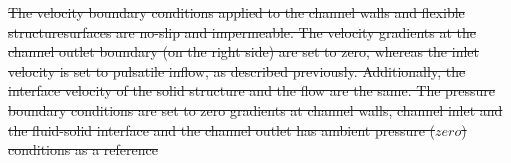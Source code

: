\documentclass[%
aip,
amsmath,amssymb,
reprint,
]{revtex4-1}
\providecommand{\DIFdel}[1]{{\protect\color{red}\sout{#1}}}                      %
\providecommand{\DIFaddbegin}{} %
\providecommand{\DIFdelbegin}{} %
\providecommand{\DIFdelend}{} %
\newcommand{\DIFscaledelfig}{0.5}
\newlength{\DIFdelgraphicswidth} %
\newlength{\DIFdelgraphicsheight} %
\newcommand{\DIFaddincludegraphics}[2][]{{\color{blue}\fbox{\DIFOincludegraphics[#1]{#2}}}} %
\newcommand{\DIFdelincludegraphics}[2][]{%
\sbox{\DIFdelgraphicsbox}{\DIFOincludegraphics[#1]{#2}}%
\settoboxwidth{\DIFdelgraphicswidth}{\DIFdelgraphicsbox} %
\settoboxtotalheight{\DIFdelgraphicsheight}{\DIFdelgraphicsbox} %
\scalebox{\DIFscaledelfig}{%
\parbox[b]{\DIFdelgraphicswidth}{\usebox{\DIFdelgraphicsbox}\\[-\baselineskip] \rule{\DIFdelgraphicswidth}{0em}}\llap{\resizebox{\DIFdelgraphicswidth}{\DIFdelgraphicsheight}{%
\setlength{\unitlength}{\DIFdelgraphicswidth}%
\begin{picture}(1,1)%
\thicklines\linethickness{2pt} %
{\color[rgb]{1,0,0}\put(0,0){\framebox(1,1){}}}%
{\color[rgb]{1,0,0}\put(0,0){\line( 1,1){1}}}%
{\color[rgb]{1,0,0}\put(0,1){\line(1,-1){1}}}%
\end{picture}%
}\hspace*{3pt}}} %
} %
\DeclareRobustCommand{\DIFaddbegin}{\DIFOaddbegin \let\includegraphics\DIFaddincludegraphics} %
\DeclareRobustCommand{\DIFdelbegin}{\DIFOdelbegin \let\includegraphics\DIFdelincludegraphics} %
\DeclareRobustCommand{\DIFdelend}{\DIFOaddend \let\includegraphics\DIFOincludegraphics} %
\begin{document}
	\DIFdelbegin \DIFdel{The velocity boundary conditions applied to the channel walls and flexible structuresurfaces are no-slip and impermeable. The velocity gradients at the channel outlet boundary (on the right side) are set to zero, whereas the inlet velocity is set to pulsatile inflow, as described previously. Additionally, the interface velocity of the solid structure and the flow are the same. The pressure boundary conditions are set to zero gradients at channel walls, channel inlet and the fluid-solid interface and the channel outlet has ambient pressure ($zero$) conditions as a reference}\DIFdelend \DIFaddbegin 

\end{document}
